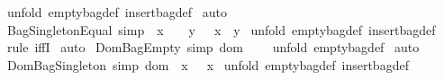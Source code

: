 \begin{isabellebody}
%
\isadelimproof
%
\endisadelimproof
%
\isatagproof
{}\isamarkupfalse%
\ {\isacharparenleft}unfold\ emptybag{\isacharunderscore}def\ insertbag{\isacharunderscore}def{\isacharparenright}\isanewline
{}\isamarkupfalse%
\ auto\isanewline
{}\isamarkupfalse%
%
\endisatagproof
{\isafoldproof}%
%
\isadelimproof
\isanewline
%
\endisadelimproof
\isanewline
\isanewline
{}\isamarkupfalse%
\ BagSingletonEqual\ {\isacharbrackleft}simp{\isacharbrackright}{\isacharcolon}\ {\isachardoublequoteopen}{\isacharparenleft}{\isacharpercent}{\isacharbrackleft}\ x\ {\isacharpercent}{\isacharbrackright}\ {\isacharequal}\ {\isacharpercent}{\isacharbrackleft}\ y\ {\isacharpercent}{\isacharbrackright}{\isacharparenright}\ {\isacharequal}\ {\isacharparenleft}x\ {\isacharequal}\ y{\isacharparenright}{\isachardoublequoteclose}\isanewline
%
\isadelimproof
%
\endisadelimproof
%
\isatagproof
{}\isamarkupfalse%
\ {\isacharparenleft}unfold\ emptybag{\isacharunderscore}def\ insertbag{\isacharunderscore}def{\isacharparenright}\isanewline
{}\isamarkupfalse%
\ {\isacharparenleft}rule\ iffI{\isacharparenright}\isanewline
{}\isamarkupfalse%
\ auto\isanewline
{}\isamarkupfalse%
%
\endisatagproof
{\isafoldproof}%
%
\isadelimproof
\isanewline
%
\endisadelimproof
\isanewline
{}\isamarkupfalse%
\ DomBagEmpty\ {\isacharbrackleft}simp{\isacharbrackright}{\isacharcolon}\ {\isachardoublequoteopen}dom\ {\isacharpercent}{\isacharbrackleft}{\isacharpercent}{\isacharbrackright}\ {\isacharequal}\ {\isacharbraceleft}{\isacharbraceright}{\isachardoublequoteclose}\isanewline
%
\isadelimproof
%
\endisadelimproof
%
\isatagproof
{}\isamarkupfalse%
\ {\isacharparenleft}unfold\ emptybag{\isacharunderscore}def{\isacharparenright}\isanewline
{}\isamarkupfalse%
\ auto\isanewline
{}\isamarkupfalse%
%
\endisatagproof
{\isafoldproof}%
%
\isadelimproof
\isanewline
%
\endisadelimproof
\isanewline
{}\isamarkupfalse%
\ DomBagSingleton\ {\isacharbrackleft}simp{\isacharbrackright}{\isacharcolon}\ {\isachardoublequoteopen}dom\ {\isacharpercent}{\isacharbrackleft}\ x\ {\isacharpercent}{\isacharbrackright}\ {\isacharequal}\ {\isacharbraceleft}x{\isacharbraceright}{\isachardoublequoteclose}\isanewline
%
\isadelimproof
%
\endisadelimproof
%
\isatagproof
{}\isamarkupfalse%
\ {\isacharparenleft}unfold\ emptybag{\isacharunderscore}def\ insertbag{\isacharunderscore}def{\isacharparenright}\isanewline
{}\isamarkupfalse%

\end{isabellebody}

